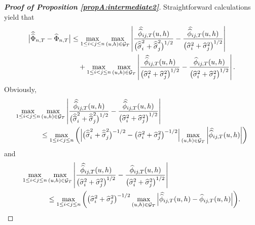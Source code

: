 \documentclass[a4paper,12pt]{article}
\newcommand{\doublehat}[1]{\skew{5.5}\widehat{\widehat{#1}}}
\newcommand{\doublehattwo}[1]{\widehat{\widehat{#1}}}
\begin{document}
\begin{proof}[\textnormal{\textbf{Proof of Proposition \ref{propA:intermediate2}}}] 
Straightforward calculations yield that
\begin{align*}
\begin{split}
\big| \doublehattwo{\Phi}_{n, T} - \widehat{\Phi}_{n, T} \big| &\le \max_{1 \le i < j \le n} \max_{(u,h) \in \mathcal{G}_T} \left|\frac{\doublehat{\phi}_{ij,T}(u,h)}{\big(\doublehattwo{\sigma}_i^2 + \doublehattwo{\sigma}_j^2\big)^{1/2}} - \frac{\doublehat{\phi}_{ij,T}(u,h)}{\big(\widehat{\sigma}_i^2 + \widehat{\sigma}_j^2\big)^{1/2}}\right| \\
&\quad+\max_{1 \le i < j \le n} \max_{(u,h) \in \mathcal{G}_T} \left|\frac{\doublehat{\phi}_{ij,T}(u,h)}{\big(\widehat{\sigma}_i^2 + \widehat{\sigma}_j^2\big)^{1/2}} - \frac{\widehat{\phi}_{ij,T}(u,h)} {\big( \widehat{\sigma}_i^2 + \widehat{\sigma}_j^2 \big)^{1/2}} \right|.
\end{split}
\end{align*}
Obviously,
\begin{align*}
\max_{1 \le i < j \le n} &\max_{(u,h) \in \mathcal{G}_T} \left|\frac{\doublehat{\phi}_{ij,T}(u,h)}{\big(\doublehattwo{\sigma}_i^2 + \doublehattwo{\sigma}_j^2\big)^{1/2}} - \frac{\doublehat{\phi}_{ij,T}(u,h)}{\big(\widehat{\sigma}_i^2 + \widehat{\sigma}_j^2\big)^{1/2}}\right|  \\
&\le\max_{1 \le i < j \le n} \left( \Big|\big(\doublehattwo{\sigma}_i^2 + \doublehattwo{\sigma}_j^2 \big)^{-1/2} - \big(\widehat{\sigma}_i^2 + \widehat{\sigma}_j^2 \big)^{-1/2}\Big| \max_{(u,h) \in \mathcal{G}_T} \left|\doublehat{\phi}_{ij,T}(u,h)\right|\right)
\end{align*}
and 
\begin{align*}
\max_{1 \le i < j \le n} &\max_{(u,h) \in \mathcal{G}_T} \left|\frac{\doublehat{\phi}_{ij,T}(u,h)}{\big(\widehat{\sigma}_i^2 + \widehat{\sigma}_j^2\big)^{1/2}} - \frac{\widehat{\phi}_{ij,T}(u,h)} {\big( \widehat{\sigma}_i^2 + \widehat{\sigma}_j^2\big)^{1/2}} \right| \\
&\le \max_{1\le i < j \le n} \bigg( \big(\widehat{\sigma}_i^2 + \widehat{\sigma}_j^2 \big)^{-1/2}\max_{(u,h) \in \mathcal{G}_T} \Big| \doublehat{\phi}_{ij, T}(u,h) - \widehat{\phi}_{ij, T}(u,h) \Big|\bigg).
\end{align*}




\end{proof}
\end{document}
